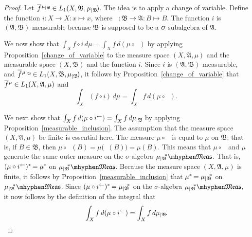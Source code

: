 \documentclass[
twoside=true,
paper=letter,
fontsize=9pt,
pagesize=auto,
leqno,
openany,
headsepline,
overfullrule,
]{scrbook}
\theoremstyle{plain}
\theoremstyle{plain}
\theoremstyle{definition}
\theoremstyle{bfnoteitalic}
\theoremstyle{bfnoteroman}
\newcommand{\sigalg}[1]{\mathfrak{#1}}
\newcommand{\textsigma}{\hbox{\large{$\sigma$}}\kern-1pt}
\newcommand{\restrictedto}[1]{_{\lvert#1}\kern-1.5pt}
\newcommand{\preimage}[1]{\mathop{#1^{\leftarrow}}}
\newcommand{\sigmaalgebra}{\sigalg{A}}
\newcommand{\sigmaalgebraii}{\sigalg{B}}
\newcommand{\measurable}[1]{{#1}\mhyphen\mathfrak{Meas}}
\newcommand{\kernast}{\ast\kern-1pt}
\newcommand{\measuresubstar}[1]{\measure\restrictedto{#1}\kern-2pt^*}
\newcommand{\measurespace}{X}
\newcommand{\mspaceelt}{x}
\newcommand{\measure}{\mu}
\newcommand*\xbar[1]{%
   \hbox{%
     \vbox{%
       \hrule height 0.4pt %
       \kern0.4ex%
       \hbox{%
         \ensuremath{#1}%
       }%
     }%
   }%
}
\newcommand{\lebclass}[1]{\hspace{.5pt}\xbar{#1}\hspace{0.5pt}}
\newcommand{\ellclass}[2]{\lebclass{#1}^{#2}}
\begin{document}
\begin{proof}
Let $\ellclass{f}{\measure\restrictedto{\sigmaalgebraii}}
\in L_1(\measurespace, \sigmaalgebraii, \measure\restrictedto{\sigmaalgebraii})$.
The idea is to apply a change of variable.
Define the function $i:\measurespace\to\measurespace:\mspaceelt\mapsto\mspaceelt$, where 
$\preimage{i}:\sigmaalgebraii\to\sigmaalgebra:B\mapsto B$.
The function 
$i$ is
$(\sigmaalgebra, \sigmaalgebraii)$\hyp{}measurable because $\sigmaalgebraii$ is supposed to be a 
$\textsigma$-subalgebra of $\sigmaalgebra$.



We now show that $\int_\measurespace f\circ i \, d\measure
= \int_\measurespace f \, d(\measure\circ\preimage i)$
by applying Proposition~\ref{change_of_variable} to the measure space $(\measurespace, \sigmaalgebra, \measure)$ and the measurable space $(\measurespace, \sigmaalgebraii)$ and the function $i$. 
Since $i$ is
$(\sigmaalgebra, \sigmaalgebraii)$\hyp{}measurable, and
$\ellclass{f}{\measure\restrictedto{\sigmaalgebraii}}
\in L_1(\measurespace, \sigmaalgebraii, \measure\restrictedto{\sigmaalgebraii})
$,
it follows by Proposition~\ref{change_of_variable} that 
$\ellclass{f}{\measure}
\in L_1(\measurespace, \sigmaalgebra, \measure)$ and
\[
\int_\measurespace (f\circ i) \, d\measure
= \int_\measurespace f \, d(\measure\circ\preimage i).
\]



We next show that 
$\int_\measurespace f \, d(\measure\circ\preimage{i})
= \int_\measurespace f \, d \measure\restrictedto{\sigmaalgebraii}$ 
by applying Proposition~\ref{measurable_inclusion}.
The assumption that the measure space $(\measurespace, \sigmaalgebra, \measure)$ be finite is essential here.
The measure $\measure\circ\preimage i$ is equal to $\measure$ on $\sigmaalgebraii$; that is, if $B\in\sigmaalgebraii$, then $\measure\circ\preimage i(B) = \measure\bigl(\preimage{i}(B)\bigr) = \measure(B)$.  
This means that $\measure\circ\preimage i$ and $\measure$ generate the same outer measure on the \textsigma-algebra
$\measurable{\measuresubstar{\sigmaalgebraii}}$. That is, $(\measure\circ\preimage i)^\kernast = \measure^\kernast$
on $\measurable{\measuresubstar{\sigmaalgebraii}}$.
Because the measure space 
$(\measurespace, \sigmaalgebra, \measure)$ is finite, it follows by Proposition~\ref{measurable_inclusion} that 
$\measure^\kernast = \measuresubstar{\sigmaalgebraii}$ on $\measurable{\measuresubstar{\sigmaalgebraii}}$.
Since 
$(\measure\circ\preimage i)^\kernast = \measuresubstar{\sigmaalgebraii}$ on the \textsigma-algebra $\measurable{\measuresubstar{\sigmaalgebraii}}$,
it now follows by the definition of the integral that 
\[
\int_\measurespace f \, d(\measure\circ\preimage{i})
= \int_\measurespace f \, d \measure\restrictedto{\sigmaalgebraii}.
\]




\end{proof}
\end{document}
